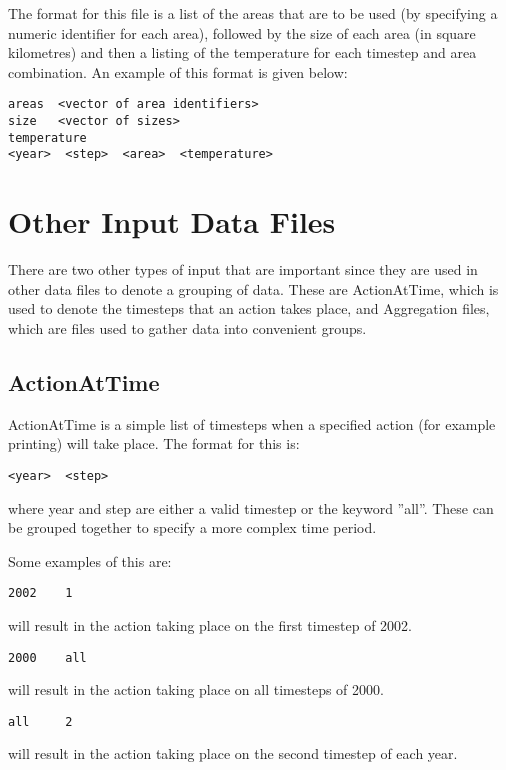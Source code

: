 \documentclass [a4paper, 10pt]{book}
\begin{document}
\bigskip
The format for this file is a list of the areas that are to be used (by specifying a numeric identifier for each area), followed by the size of each area (in square kilometres) and then a listing of the temperature for each timestep and area combination.  An example of this format is given below:

{\small\begin{verbatim}
areas  <vector of area identifiers>
size   <vector of sizes>
temperature
<year>  <step>  <area>  <temperature>
\end{verbatim}}

\section{Other Input Data Files}\label{sec:otherinputfile}
There are two other types of input that are important since they are used in other data files to denote a grouping of data.  These are ActionAtTime, which is used to denote the timesteps that an action takes place, and Aggregation files, which are files used to gather data into convenient groups.

\subsection{ActionAtTime}
ActionAtTime is a simple list of timesteps when a specified action (for example printing) will take place.  The format for this is:

{\small\begin{verbatim}
<year>  <step>
\end{verbatim}}

where year and step are either a valid timestep or the keyword ''all''.  These can be grouped together to specify a more complex time period.\newline

Some examples of this are:
{\small\begin{verbatim}
2002    1
\end{verbatim}}
will result in the action taking place on the first timestep of 2002.

{\small\begin{verbatim}
2000    all
\end{verbatim}}
will result in the action taking place on all timesteps of 2000.

{\small\begin{verbatim}
all     2
\end{verbatim}}
will result in the action taking place on the second timestep of each year.
\end{document}
